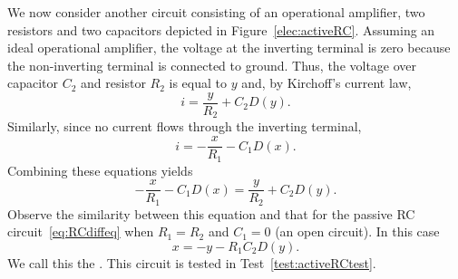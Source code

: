 We now consider another circuit consisting of an operational amplifier, two resistors and two capacitors depicted in Figure~\ref{elec:activeRC}.  Assuming an ideal operational amplifier, the voltage at the inverting terminal is zero because the non-inverting terminal is connected to ground.  Thus, the voltage over capacitor $C_2$ and resistor $R_2$ is equal to $y$ and, by Kirchoff's current law,
\[
i = \frac{y}{R_2} + C_2 D(y).
\]
Similarly, since no current flows through the inverting terminal,
\[
i = -\frac{x}{R_1} - C_1 D(x).
\]
Combining these equations yields
\begin{equation}\label{eq:twoaparrarrelRCactive}
-\frac{x}{R_1} - C_1 D(x) = \frac{y}{R_2} + C_2 D(y).
\end{equation}
Observe the similarity between this equation and that for the passive RC circuit~\eqref{eq:RCdiffeq} when $R_1 = R_2$ and $C_1 = 0$ (an open circuit).  In this case
\begin{equation}\label{eq:activeRC}
x = - y - R_1 C_2 D(y).
\end{equation}
We call this the .  This circuit is tested in Test~\ref{test:activeRCtest}.


